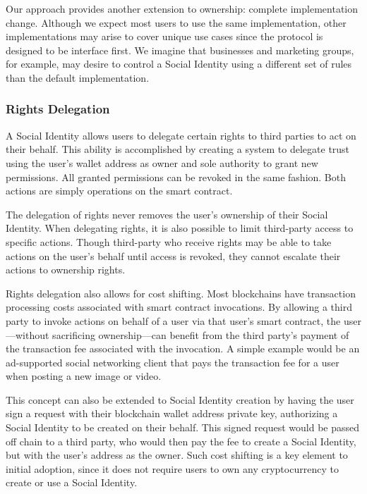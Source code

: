\documentclass[12pt,letterpaper]{article}
\begin{document}
Our  approach provides another extension to ownership: complete
implementation change. Although we expect most users to use the same implementation, other
implementations may arise to cover unique use cases since the protocol is designed to be
interface first. We imagine that businesses and marketing groups, for example, may desire
to control a Social Identity using a different set of rules than the default
implementation.

\subsubsection{Rights Delegation}

A Social Identity allows users to delegate certain rights to third parties to act on their
behalf. This ability is accomplished by creating a system to delegate trust using the
user's wallet address as owner and sole authority to grant new permissions. All granted
permissions can be revoked in the same fashion. Both actions are simply operations on the
smart contract.

The delegation of rights never removes the user's ownership of their Social Identity. When
delegating rights, it is also possible to limit third-party access to specific actions.
Though third-party  who receive rights may be able to take actions on the
user's behalf until access is revoked, they cannot escalate their actions to ownership
rights.

Rights delegation also allows for cost shifting. Most blockchains have transaction
processing costs associated with smart contract invocations. By allowing a third party to
invoke actions on behalf of a user via that user's smart contract, the user---without
sacrificing ownership---can benefit from the third party's payment of the transaction fee
associated with the invocation. A simple example would be an ad-supported social
networking client that pays the transaction fee for a user when posting a new image or
video.

This concept can also be extended to Social Identity creation by having the user sign a
request with their blockchain wallet address private key, authorizing a Social Identity to
be created on their behalf. This signed request would be passed off chain to a third
party, who would then pay the fee to create a Social Identity, but with the user's address
as the owner. Such cost shifting is a key element to initial adoption, since it does not
require users to own any cryptocurrency to create or use a Social Identity.
\end{document}
